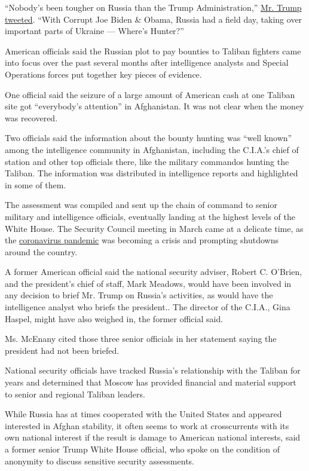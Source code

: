 ``Nobody's been tougher on Russia than the Trump Administration,''
\href{https://www.twitter.com/realDonaldTrump/status/1277202162070753280}{Mr.
Trump tweeted}. ``With Corrupt Joe Biden \& Obama, Russia had a field
day, taking over important parts of Ukraine --- Where's Hunter?''

American officials said the Russian plot to pay bounties to Taliban
fighters came into focus over the past several months after intelligence
analysts and Special Operations forces put together key pieces of
evidence.

One official said the seizure of a large amount of American cash at one
Taliban site got ``everybody's attention'' in Afghanistan. It was not
clear when the money was recovered.

Two officials said the information about the bounty hunting was ``well
known'' among the intelligence community in Afghanistan, including the
C.I.A.'s chief of station and other top officials there, like the
military commandos hunting the Taliban. The information was distributed
in intelligence reports and highlighted in some of them.

The assessment was compiled and sent up the chain of command to senior
military and intelligence officials, eventually landing at the highest
levels of the White House. The Security Council meeting in March came at
a delicate time, as the
\href{https://www.nytimes.com/news-event/coronavirus}{coronavirus
pandemic} was becoming a crisis and prompting shutdowns around the
country.

A former American official said the national security adviser, Robert C.
O'Brien, and the president's chief of staff, Mark Meadows, would have
been involved in any decision to brief Mr. Trump on Russia's activities,
as would have the intelligence analyst who briefs the president.. The
director of the C.I.A., Gina Haspel, might have also weighed in, the
former official said.

Ms. McEnany cited those three senior officials in her statement saying
the president had not been briefed.

National security officials have tracked Russia's relationship with the
Taliban for years and determined that Moscow has provided financial and
material support to senior and regional Taliban leaders.

While Russia has at times cooperated with the United States and appeared
interested in Afghan stability, it often seems to work at crosscurrents
with its own national interest if the result is damage to American
national interests, said a former senior Trump White House official, who
spoke on the condition of anonymity to discuss sensitive security
assessments.

